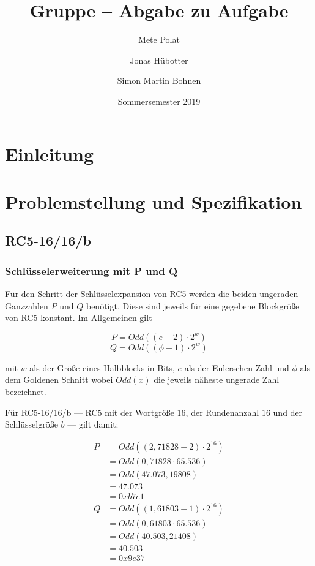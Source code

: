 \documentclass[course=erap]{aspdoc}
\author{Mete Polat \and Jonas Hübotter \and Simon Martin Bohnen}
\date{Sommersemester 2019} %
\title{Gruppe \theGroup{} -- Abgabe zu Aufgabe \theNumber}
\begin{document}
\maketitle

\section{Einleitung}


\section{Problemstellung und Spezifikation}
\subsection{RC5-16/16/b}

\subsubsection{Schlüsselerweiterung mit P und Q}

Für den Schritt der Schlüsselexpansion von RC5 werden die beiden ungeraden Ganzzahlen $P$ und $Q$ benötigt. Diese sind jeweils für eine gegebene Blockgröße von RC5 konstant. Im Allgemeinen gilt

\begin{equation}
    P = Odd((e - 2) \cdot 2^w)
\end{equation}
\begin{equation}
    Q = Odd((\phi - 1) \cdot 2^w)
\end{equation}

mit $w$ als der Größe eines Halbblocks in Bits, $e$ als der Eulerschen Zahl und $\phi$ als dem Goldenen Schnitt wobei $Odd(x)$ die jeweils näheste ungerade Zahl bezeichnet.\bigbreak

Für RC5-16/16/b --- RC5 mit der Wortgröße $16$, der Rundenanzahl $16$ und der Schlüsselgröße $b$ --- gilt damit:

\begin{align*}
    P &= Odd((2,71828 - 2) \cdot 2^{16}) \\
      &= Odd(0,71828 \cdot 65.536) \\
      &= Odd(47.073,19808) \\
      &= 47.073 \\
      &= 0xb7e1 \\
    Q &= Odd((1,61803 - 1) \cdot 2^{16}) \\
      &= Odd(0,61803 \cdot 65.536) \\
      &= Odd(40.503,21408) \\
      &= 40.503 \\
      &= 0x9e37
\end{align*}
\end{document}
